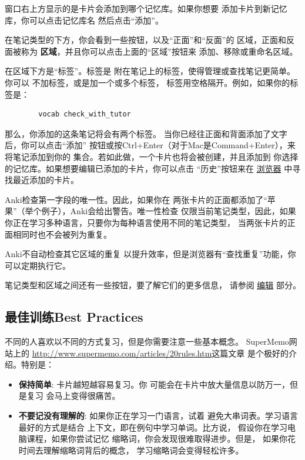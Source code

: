 \documentclass[a4paper]{book}
\begin{document}
	窗口右上方显示的是卡片会添加到哪个记忆库。如果你想要 添加卡片到新记忆库，你可以点击记忆库名 然后点击“添加”。
	
	在笔记类型的下方，你会看到一些按钮，以及“正面”和“反面”的 区域，正面和反面被称为 \textbf{区域}，并且你可以点击上面的“区域”按钮来 添加、移除或重命名区域。
	
	在区域下方是“标签”。标签是 附在笔记上的标签，使得管理或查找笔记更简单。你可以 不加标签，或是加一个或多个标签， 标签用空格隔开。例如，如果你的标签是：
	
	\begin{shaded}\begin{verbatim}
		vocab check_with_tutor
		\end{verbatim}\end{shaded}
	
	那么，你添加的这条笔记将会有两个标签。
	当你已经往正面和背面添加了文字后，你可以点击“添加” 按钮或按Ctrl+Enter（对于Mac是Command+Enter），来将笔记添加到你的 集合。若如此做，一个卡片也将会被创建，并且添加到 你选择的记忆库。如果想要编辑已添加的卡片，你可以点击 “历史”按钮来在 \hyperref[browser]{浏览器} 中寻找最近添加的卡片。
	
	Anki检查第一字段的唯一性。因此，如果你在 两张卡片的正面都添加了“苹果”（举个例子），Anki会给出警告。唯一性检查 仅限当前笔记类型，因此，如果你正在学习多种语言，只要你为每种语言使用不同的笔记类型， 当两张卡片的正面相同时也不会被列为重复。
	
	Anki不自动检查其它区域的重复 以提升效率，但是浏览器有“查找重复”功能，你可以定期执行它。
	
	笔记类型和区域之间还有一些按钮，要了解它们的更多信息， 请参阅
	\hyperref[editor]{编辑} 部分。
	
	\subsection{最佳训练Best Practices}
	
	不同的人喜欢以不同的方式复习，但是你需要注意一些基本概念。 SuperMemo网站上的 \url{http://www.supermemo.com/articles/20rules.htm}这篇文章 是个极好的介绍。特别是：
	
	\begin{itemize}
		\itemsep1pt\parskip0pt
		\item \textbf{保持简单}: 卡片越短越容易复习。你 可能会在卡片中放大量信息以防万一，但是复习 会马上变得很痛苦。
		\item \textbf{不要记没有理解的}: 如果你正在学习一门语言，试着 避免大串词表。学习语言最好的方式是结合 上下文，即在例句中学习单词。比方说， 假设你在学习电脑课程，如果你尝试记忆 缩略词，你会发现很难取得进步。但是， 如果你花时间去理解缩略词背后的概念， 学习缩略词会变得轻松许多。
	\end{itemize}
	
\end{document}
